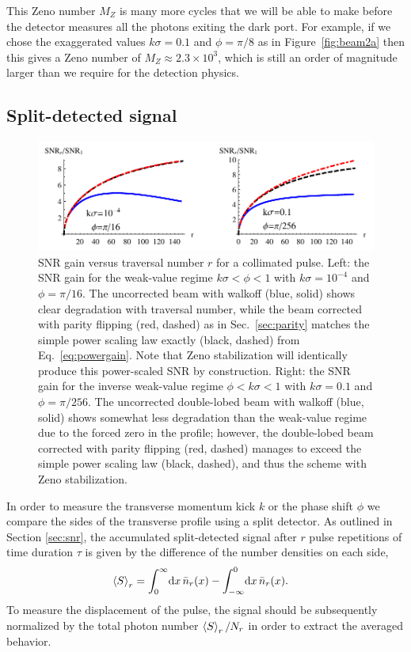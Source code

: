 This Zeno number $M_Z$ is many more cycles that we will be able to make before the detector measures all the photons exiting the dark port.  For example, if we chose the exaggerated values $k \sigma = 0.1$ and $\phi=\pi/8$ as in Figure~\ref{fig:beam2a} then this gives a Zeno number of $M_Z \approx 2.3 \times 10^3$, which is still an order of magnitude larger than we require for the detection physics.


\subsection{Split-detected signal}
\begin{figure}[th]
  \begin{center}
    \includegraphics[width=6in]{PulsedRecycling/Figures/snrplot.pdf}
  \end{center}
  \caption{SNR gain versus traversal number $r$ for a collimated pulse.  Left: the SNR gain for the weak-value regime $k\sigma < \phi < 1$ with $k\sigma = 10^{-4}$ and $\phi = \pi/16$.  The uncorrected beam with walkoff (blue, solid) shows clear degradation with traversal number, while the beam corrected with parity flipping (red, dashed) as in Sec.~\ref{sec:parity} matches the simple power scaling law exactly (black, dashed) from Eq.~\eqref{eq:powergain}. Note that Zeno stabilization will identically produce this power-scaled SNR by construction.  Right: the SNR gain for the inverse weak-value regime $\phi < k\sigma < 1$ with $k\sigma = 0.1$ and $\phi = \pi/256$.  The uncorrected double-lobed beam with walkoff (blue, solid) shows somewhat less degradation than the weak-value regime due to the forced zero in the profile; however, the double-lobed beam corrected with parity flipping (red, dashed) manages to exceed the simple power scaling law (black, dashed), and thus the scheme with Zeno stabilization.}
  \label{fig:collimatedsnr}
\end{figure}

In order to measure the transverse momentum kick $k$ or the phase shift $\phi$ we compare the sides of the transverse profile using a split detector.  As outlined in Section \ref{sec:snr}, the accumulated split-detected signal after $r$ pulse repetitions of time duration $\tau$ is given by the difference of the number densities on each side,
\begin{align}
  \left\langle S \right\rangle_r &= \int_0^\infty \!\textrm{d}x\, \bar{n}_r(x) - \int_{-\infty}^0 \!\textrm{d}x\, \bar{n}_r(x).
\end{align}
To measure the displacement of the pulse, the signal should be subsequently normalized by the total photon number $\left\langle S \right\rangle_r / N_r$ in order to extract the averaged behavior.

